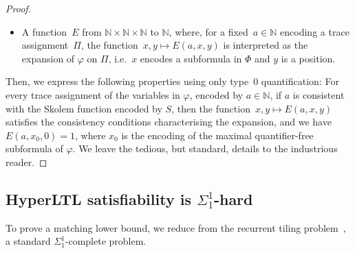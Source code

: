 \documentclass[dvipsnames,10pt,a4paper]{amsart}
\theoremstyle{definition}
\theoremstyle{remark}
\newcommand{\nats}{\mathbb{N}}
\newcommand{\hyltl}{{HyperLTL}\xspace}
\begin{document}
\begin{proof}
\begin{itemize}
	\item A function~$E$ from $\nats \times \nats \times \nats$ to $\nats$, where, for a fixed~$a \in\nats$ encoding a trace assignment~$\Pi$, the function~$x,y\mapsto E(a, x, y)$ is interpreted as the expansion of $\varphi$ on $\Pi$, i.e.\ $x$ encodes a subformula in $\Phi$ and $y$ is a position.

\end{itemize}
Then, we express the following properties using only type~$0$ quantification: For every trace assignment of the variables in $\varphi$, encoded by $a \in \nats$, if $a$ is consistent with the Skolem function encoded by $S$, then the function~$x,y\mapsto E(a, x, y)$ satisfies the consistency conditions characterising the expansion, and we have $E(a,x_0, 0) = 1$, where $x_0$ is the encoding of the maximal quantifier-free subformula of $\varphi$.
 We leave the tedious, but standard, details to the industrious reader. 
\end{proof}

\subsection{\texorpdfstring{\hyltl}{HyperLTL} satisfiability is \texorpdfstring{$\Sigma_1^1$}{Sigma11}-hard} 
To prove a matching lower bound, we reduce from the recurrent tiling problem~\cite{Harel85}, a standard $\Sigma_1^1$-complete problem.
\end{document}
